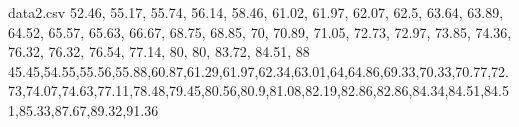 
\begin{filecontents*}{data2.csv}
52.46, 55.17, 55.74, 56.14, 58.46, 61.02, 61.97, 62.07, 62.5, 63.64, 63.89, 64.52, 65.57, 65.63, 66.67, 68.75, 68.85, 70, 70.89, 71.05, 72.73, 72.97, 73.85, 74.36, 76.32, 76.32, 76.54, 77.14, 80, 80, 83.72, 84.51, 88
45.45,54.55,55.56,55.88,60.87,61.29,61.97,62.34,63.01,64,64.86,69.33,70.33,70.77,72.73,74.07,74.63,77.11,78.48,79.45,80.56,80.9,81.08,82.19,82.86,82.86,84.34,84.51,84.51,85.33,87.67,89.32,91.36
\end{filecontents*}

